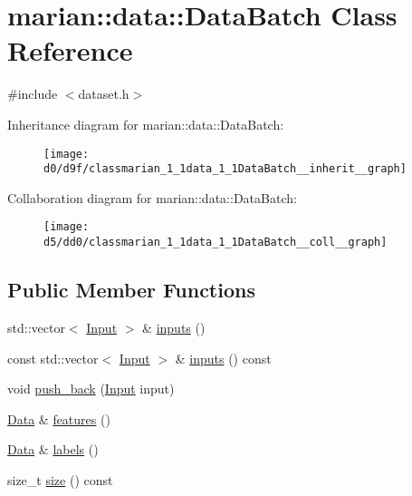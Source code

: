 \hypertarget{classmarian_1_1data_1_1DataBatch}{}\section{marian\+:\+:data\+:\+:Data\+Batch Class Reference}
\label{classmarian_1_1data_1_1DataBatch}


{\ttfamily \#include $<$dataset.\+h$>$}



Inheritance diagram for marian\+:\+:data\+:\+:Data\+Batch\+:
\nopagebreak
\begin{figure}[H]
\begin{center}
\leavevmode
\texttt{[image: d0/d9f/classmarian\_1\_1data\_1\_1DataBatch\_\_inherit\_\_graph]}
\end{center}
\end{figure}


Collaboration diagram for marian\+:\+:data\+:\+:Data\+Batch\+:
\nopagebreak
\begin{figure}[H]
\begin{center}
\leavevmode
\texttt{[image: d5/dd0/classmarian\_1\_1data\_1\_1DataBatch\_\_coll\_\_graph]}
\end{center}
\end{figure}
\subsection*{Public Member Functions}
\begin{DoxyCompactItemize}
\item 
std\+::vector$<$ \hyperlink{classmarian_1_1data_1_1Input}{Input} $>$ \& \hyperlink{classmarian_1_1data_1_1DataBatch_a3d6ace52303ab3f26fc351ca4f098040}{inputs} ()
\item 
const std\+::vector$<$ \hyperlink{classmarian_1_1data_1_1Input}{Input} $>$ \& \hyperlink{classmarian_1_1data_1_1DataBatch_a2c28ac6dec880560e37798296e472692}{inputs} () const 
\item 
void \hyperlink{classmarian_1_1data_1_1DataBatch_ad6232318601d04de84a86587499e84aa}{push\+\_\+back} (\hyperlink{classmarian_1_1data_1_1Input}{Input} input)
\item 
\hyperlink{namespacemarian_1_1data_a5801e80ecb76ee38a5ac080f08d9646c}{Data} \& \hyperlink{classmarian_1_1data_1_1DataBatch_af3ab2b78b7692a716a319006c35ca5ca}{features} ()
\item 
\hyperlink{namespacemarian_1_1data_a5801e80ecb76ee38a5ac080f08d9646c}{Data} \& \hyperlink{classmarian_1_1data_1_1DataBatch_a63cef28fe2f2a697abe429b10cdf1269}{labels} ()
\item 
size\+\_\+t \hyperlink{classmarian_1_1data_1_1DataBatch_a19021abc5f6e1aeed56c3b68d49a4a4a}{size} () const 
\end{DoxyCompactItemize}
